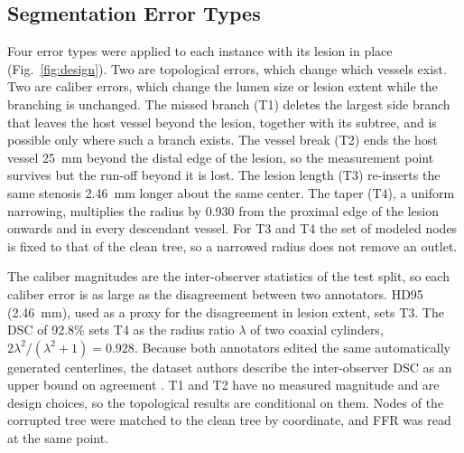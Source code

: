 \documentclass[journal,twoside,web]{ieeecolor}
\begin{document}
\subsection{Segmentation Error Types}
Four error types were applied to each instance with its lesion in place (Fig.~\ref{fig:design}). Two are
topological errors, which change which vessels exist. Two are caliber errors, which change the lumen size or lesion
extent while the branching is unchanged. The missed branch (T1) deletes the largest side branch that leaves the host
vessel beyond the lesion, together with its subtree, and is possible only where such a branch exists. The vessel break (T2) ends the host vessel 25~mm beyond the
distal edge of the lesion, so the measurement point survives but the run-off beyond it is lost. The lesion length
(T3) re-inserts the same stenosis 2.46~mm longer about the same center. The taper (T4), a uniform narrowing, multiplies the radius by 0.930 from the proximal
edge of the lesion onwards and in every descendant vessel. For T3 and T4 the set of modeled nodes is fixed to that
of the clean tree, so a narrowed radius does not remove an outlet.

The caliber magnitudes are the inter-observer statistics of the test split, so each caliber error is as large as
the disagreement between two annotators. HD95 (2.46~mm), used as a proxy for the disagreement in lesion extent, sets T3. The DSC of 92.8\% sets T4 as the radius
ratio $\lambda$ of two coaxial cylinders, $2\lambda^2/(\lambda^2+1) = 0.928$. Because both annotators edited the same automatically
generated centerlines, the dataset authors describe the inter-observer DSC as an upper bound on agreement \cite{bransby2026}. T1 and T2 have
no measured magnitude and are design choices, so the topological results are conditional on them. Nodes of the corrupted tree were matched to the clean tree by
coordinate, and FFR was read at the same point.
\end{document}
